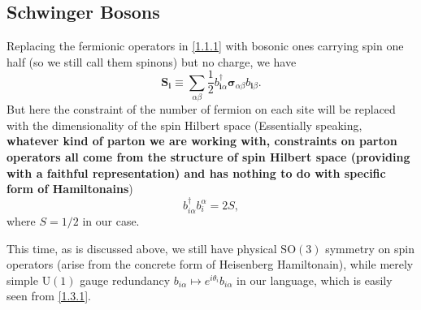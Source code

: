 \documentclass[10pt,nofootinbib]{revtex4}
\begin{document}
	\subsection{Schwinger Bosons}
	Replacing the fermionic operators in \eqref{1.1.1} with bosonic ones carrying spin one half (so we still call them spinons) but no charge, we have
	\begin{equation}\label{1.3.1}
		\bm{S}_{\bm{i}}\equiv\sum_{\alpha \beta}\dfrac{1}{2}b_{\bm{i}\alpha}^\dagger\bm{\sigma}_{\alpha \beta}b_{\bm{i}\beta}.
	\end{equation}
	But here the constraint of the number of fermion on each site will be replaced with the dimensionality of the spin Hilbert space (Essentially speaking, \textbf{whatever kind of parton we are working with, constraints on parton operators all come from the structure of spin Hilbert space (providing with a faithful representation) and has nothing to do with specific form of Hamiltonains})
	\begin{equation}\label{1.3.2}
		b_{i \alpha}^\dagger b_i^\alpha=2S,
	\end{equation}
	where $S=1/2$ in our case.\par
	This time, as is discussed above, we still have physical $\mathrm{SO}(3)$ symmetry on spin operators (arise from the concrete form of Heisenberg Hamiltonain), while merely simple $\mathrm{U}(1)$ gauge redundancy $b_{i\alpha}\mapsto e^{i\theta_i}b_{i \alpha}$ in our language, which is easily seen from \eqref{1.3.1}.
\end{document}
